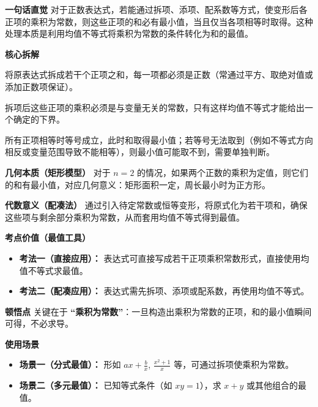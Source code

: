 \begin{explanationbox}
	\textbf{\textcolor{CExplanation}{一句话直觉}}
	对于正数表达式，若能通过拆项、添项、配系数等方式，使变形后各正项的乘积为常数，则这些正项的和必有最小值，当且仅当各项相等时取得。这种处理本质是利用均值不等式将乘积为常数的条件转化为和的最值。

	\medskip
	\textbf{\textcolor{CExplanation}{核心拆解}}
	\begin{description}[style=nextline, leftmargin=2.8em, labelsep=0.5em, itemsep=0.45em]
		\item[\textbf{要点一（正项构造）：}]
			将原表达式拆成若干个正项之和，每一项都必须是正数（常通过平方、取绝对值或添加正数项保证）。
		\item[\textbf{要点二（乘积定值）：}]
			拆项后这些正项的乘积必须是与变量无关的常数，只有这样均值不等式才能给出一个确定的下界。
		\item[\textbf{要点三（取等条件）：}]
			所有正项相等时等号成立，此时和取得最小值；若等号无法取到（例如不等式方向相反或变量范围导致不能相等），则最小值可能取不到，需要单独判断。
	\end{description}

	\medskip
	\textbf{\textcolor{CExplanation}{几何本质（矩形模型）}}
	对于 $n=2$ 的情况，如果两个正数的乘积为定值，则它们的和有最小值，对应几何意义：矩形面积一定，周长最小时为正方形。

	\medskip
	\textbf{\textcolor{CExplanation}{代数意义（配凑法）}}
	通过引入待定常数或恒等变形，将原式化为若干项和，确保这些项与剩余部分乘积为常数，从而套用均值不等式得到最值。

	\medskip
	\textbf{\textcolor{CExplanation}{考点价值（最值工具）}}
	\begin{itemize}[leftmargin=*, itemsep=0.5em, topsep=0.4em]
		\item \textbf{考法一（直接应用）：} 表达式可直接写成若干正项乘积常数形式，直接使用均值不等式求最值。
		\item \textbf{考法二（配凑应用）：} 表达式需先拆项、添项或配系数，再使用均值不等式。
	\end{itemize}

	\medskip
	\textbf{\textcolor{CExplanation}{顿悟点}}
	关键在于 \textbf{“乘积为常数”}：一旦构造出乘积为常数的正项，和的最小值瞬间可得，不必求导。

	\medskip
	\textbf{\textcolor{CExplanation}{使用场景}}
	\begin{itemize}[leftmargin=*, itemsep=0.5em, topsep=0.4em]
		\item \textbf{场景一（分式最值）：} 形如 $ax+\displaystyle\frac{b}{x}$, $\displaystyle\frac{x^2+1}{x}$ 等，可通过拆项使乘积为常数。
		\item \textbf{场景二（多元最值）：} 已知等式条件（如 $xy=1$），求 $x+y$ 或其他组合的最值。
	\end{itemize}

\end{explanationbox}
